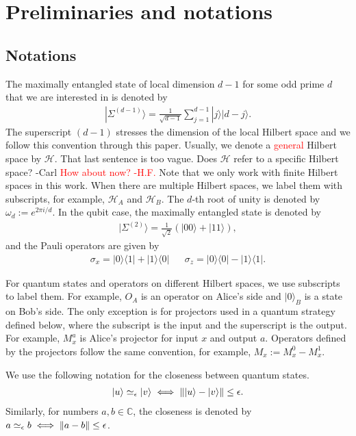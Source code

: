 \documentclass[11pt,letterpaper]{article}
\newcommand{\ket}[1]{|#1\rangle}
\newcommand{\ketbra}[2]{|#1\rangle\langle#2|}
\DeclarePairedDelimiter{\norm}{\lVert}{\rVert}
\newcommand{\C}{\mathbb{C}}
\newcommand{\calH}{\mathcal{H}}
\newcommand{\1}{\mathbb{1}}
\newcommand{\EPR}[1]{\Sigma^{(#1)}}
\newcommand{\paulix}{\sigma_x}
\newcommand{\pauliz}{\sigma_z}
\newcommand{\appd}[1]{\simeq_{#1}}
\def\carl#1{{\color{blue} #1 -Carl}}
\newcommand{\hf}[1]{\textcolor{red}{#1}}
\newcommand{\hfc}[1]{\textcolor{red}{#1 -H.F.}}
\theoremstyle{definition}
\begin{document}
\section{Preliminaries and notations}
\label{sec:prelim}
\subsection{Notations}
The maximally entangled state of local dimension $d-1$ for some odd prime $d$ that we are interested in is denoted by
\begin{align}
\ket{\EPR{d-1}} = \frac{1}{\sqrt{d-1}} \sum_{j = 1}^{d-1} \ket{j}\ket{d-j}.
\end{align}
The superscript $(d-1)$ stresses the dimension of the local Hilbert space and we follow this convention through this paper.
Usually, we denote a \hf{general} Hilbert space by $\calH$.  
\carl{That last sentence is too vague.  Does $\calH$ refer to a specific Hilbert space?}
\hfc{How about now?}
Note that we only work with finite Hilbert spaces in this work.
When there are multiple Hilbert spaces, we label them with subscripts, for example, $\calH_A$ and
$\calH_B$.
The $d$-th root of unity is denoted by $\omega_d:=e^{2\pi i/d}$. In the qubit case, 
the maximally entangled state is denoted by 
\begin{align}
	\ket{\EPR{2}} = \frac{1}{\sqrt{2}}(\ket{00} + \ket{11}),
\end{align}
and the Pauli operators are given by
\begin{align}
	\paulix = \ketbra{0}{1}+\ketbra{1}{0} && \pauliz = \ketbra{0}{0} - \ketbra{1}{1}.
\end{align}

For quantum states and operators on different Hilbert spaces, we use subscripts to label them.
For example, $O_A$ is an operator on Alice's side and $\ket{0}_{B}$ is a state on Bob's side. 
The only exception is for projectors used in a quantum strategy defined below, where the subscript 
is the input and the superscript is the output. For example, $M_x^a$ is Alice's projector for input $x$ and output $a$.
Operators defined by the projectors follow the same convention, for example, $M_x := M_x^0 - M_x^1$.

We use the following notation for the closeness between quantum states.
\begin{align}
	\ket{u} \appd{\epsilon} \ket{v} \iff \norm{\ket{u} - \ket{v}} \leq \epsilon. 
\end{align}
Similarly, for numbers $a,b \in \C$, the closeness is denoted by
$a \appd{\epsilon} b \iff \norm{a-b} \leq \epsilon$.
\end{document}
